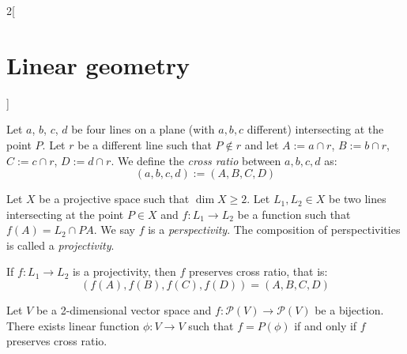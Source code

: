 \documentclass[../../../main_math.tex]{subfiles}
\begin{document}
\begin{multicols}{2}[\section{Linear geometry}]
  \begin{definition}
    Let $a$, $b$, $c$, $d$ be four lines on a plane (with $a,b,c$ different) intersecting at the point $P$. Let $r$ be a different line such that $P\notin r$ and let $A:=a\cap r$, $B:=b\cap r$, $C:=c\cap r$, $D:=d\cap r$. We define the \emph{cross ratio} between $a,b,c,d$ as: $$(a,b,c,d):=(A,B,C,D)$$
  \end{definition}
  \begin{definition}
    Let $X$ be a projective space such that $\dim X\geq 2$. Let $L_1,L_2\in X$ be two lines intersecting at the point $P\in X$ and $f:L_1\rightarrow L_2$ be a function such that $f(A)=L_2\cap PA$. We say $f$ is a \emph{perspectivity}. The composition of perspectivities is called a \emph{projectivity}.
  \end{definition}
  \begin{theorem}
    If $f:L_1\rightarrow L_2$ is a projectivity, then $f$ preserves cross ratio, that is: $$(f(A),f(B),f(C),f(D))=(A,B,C,D)$$
  \end{theorem}
  \begin{theorem}
    Let $V$ be a 2-dimensional vector space and $f:\mathcal{P}(V)\rightarrow \mathcal{P}(V)$ be a bijection. There exists linear function $\phi:V\rightarrow V$ such that $f=P(\phi)$ if and only if $f$ preserves cross ratio.
  \end{theorem}

\end{multicols}
\end{document}
